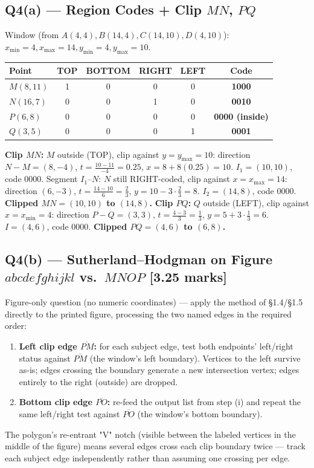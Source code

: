 \documentclass[12pt, a4paper]{article}
\newenvironment{solutionbox}{\begin{mdframed}[style=solutionframe]}{\end{mdframed}}
\newenvironment{answerbox}{\begin{mdframed}[style=answerframe]}{\end{mdframed}}
\begin{document}
\subsection*{Q4(a) --- Region Codes + Clip $MN$, $PQ$}
\begin{solutionbox}
Window (from $A(4,4),B(14,4),C(14,10),D(4,10)$): $x_{\min}=4,x_{\max}=14,y_{\min}=4,y_{\max}=10$.
\begin{center}
\begin{tabular}{lccccc}
\toprule
Point & TOP & BOTTOM & RIGHT & LEFT & Code \\
\midrule
$M(8,11)$ & 1 & 0 & 0 & 0 & \textbf{1000} \\
$N(16,7)$ & 0 & 0 & 1 & 0 & \textbf{0010} \\
$P(6,8)$ & 0 & 0 & 0 & 0 & \textbf{0000 (inside)} \\
$Q(3,5)$ & 0 & 0 & 0 & 1 & \textbf{0001} \\
\bottomrule
\end{tabular}
\end{center}
\textbf{Clip $MN$:} $M$ outside (TOP), clip against $y=y_{\max}=10$: direction $N-M=(8,-4)$, $t=\frac{10-11}{-4}=0.25$, $x=8+8(0.25)=10$. $I_1=(10,10)$, code $0000$. Segment $I_1$--$N$: $N$ still RIGHT-coded, clip against $x=x_{\max}=14$: direction $(6,-3)$, $t=\frac{14-10}{6}=\frac23$, $y=10-3\cdot\frac23=8$. $I_2=(14,8)$, code $0000$. \textbf{Clipped $MN=(10,10)$ to $(14,8)$.}
\textbf{Clip $PQ$:} $Q$ outside (LEFT), clip against $x=x_{\min}=4$: direction $P-Q=(3,3)$, $t=\frac{4-3}{3}=\frac13$, $y=5+3\cdot\frac13=6$. $I=(4,6)$, code $0000$. \textbf{Clipped $PQ=(4,6)$ to $(6,8)$.}
\end{solutionbox}

\subsection*{Q4(b) --- Sutherland--Hodgman on Figure $abcdefghijkl$ vs.\ $MNOP$ [3.25 marks]}
\begin{answerbox}
Figure-only question (no numeric coordinates) --- apply the method of \S1.4/\S1.5 directly to the printed figure, processing the two named edges in the required order:
\begin{enumerate}[noitemsep]
  \item \textbf{Left clip edge $\overline{PM}$:} for each subject edge, test both endpoints' left/right status against $\overline{PM}$ (the window's left boundary). Vertices to the left survive as-is; edges crossing the boundary generate a new intersection vertex; edges entirely to the right (outside) are dropped.
  \item \textbf{Bottom clip edge $\overline{PO}$:} re-feed the output list from step (i) and repeat the same left/right test against $\overline{PO}$ (the window's bottom boundary).
\end{enumerate}
The polygon's re-entrant "V" notch (visible between the labeled vertices in the middle of the figure) means several edges cross each clip boundary twice --- track each subject edge independently rather than assuming one crossing per edge.
\end{answerbox}
\end{document}
